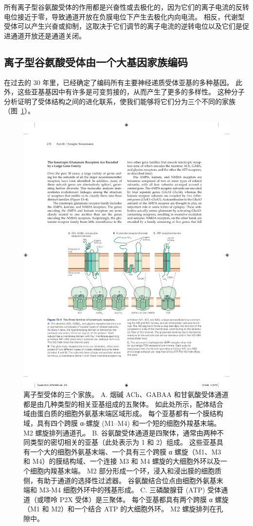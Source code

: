 所有离子型谷氨酸受体的作用都是兴奋性或去极化的，因为它们的离子电流的反转电位接近于零，导致通道开放在负膜电位下产生去极化内向电流。
相反，代谢型受体可以产生兴奋或抑制，这取决于它们调节的离子电流的逆转电位以及它们是促进通道开放还是通道关闭。



\subsection{离子型谷氨酸受体由一个大基因家族编码}

在过去的 30 年里，已经确定了编码所有主要神经递质受体亚基的多种基因。
此外，这些亚基基因中有许多是可变剪接的，从而产生了更多的多样性。
这种分子分析证明了受体结构之间的进化联系，使我们能够将它们分为三个不同的家族（图~\ref{fig:13_4}）。


\begin{figure}[htbp]
	\centering
	\includegraphics[width=0.75\linewidth]{chap13/fig_13_4}
	\caption{离子型受体的三个家族。 A. 烟碱 ACh、GABAA 和甘氨酸受体通道都是由几种类型的相关亚基组成的五聚体。 如此处所示，配体结合域由蛋白质的细胞外氨基末端区域形成。 每个亚基都有一个膜结构域，具有四个跨膜 α-螺旋 (M1–M4) 和一个短的细胞外羧基末端。 M2 螺旋排列通道孔。 B. 谷氨酸受体通道是四聚体，通常由两种不同类型的密切相关的亚基（此处表示为 1 和 2）组成。 这些亚基具有一个大的细胞外氨基末端、一个具有三个跨膜 α 螺旋（M1、M3 和 M4）的膜结构域、一个连接 M3 和 M4 螺旋的大细胞外环以及一个细胞内羧基末端。 M2 部分形成一个环，浸入和浸出膜的细胞质侧，有助于通道的选择性过滤器。 谷氨酸结合位点由细胞外氨基末端和 M3-M4 细胞外环中的残基形成。 C. 三磷酸腺苷 (ATP) 受体通道（或嘌呤 P2X 受体）是三聚体。 每个亚基都具有两个跨膜 α 螺旋（M1 和 M2）和一个结合 ATP 的大细胞外环。 M2 螺旋排列在孔隙中。}
	\label{fig:13_4}
\end{figure}


